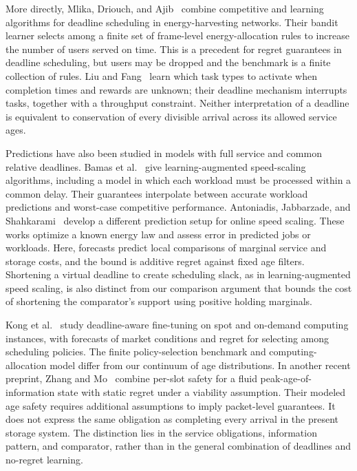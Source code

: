 \documentclass[11pt]{article}
\theoremstyle{plain}
\theoremstyle{remark}
\numberwithin{equation}{section}
\begin{document}
More directly, Mlika, Driouch, and Ajib~\cite{mlika2019deadline} combine
competitive and learning algorithms for deadline scheduling in
energy-harvesting networks. Their bandit learner selects among a finite
set of frame-level energy-allocation rules to increase the number of users
served on time. This is a precedent for regret guarantees in deadline
scheduling, but users may be dropped and the benchmark is a finite
collection of rules. Liu and Fang~\cite{liu2023scheduling} learn which task
types to activate when completion times and rewards are unknown; their
deadline mechanism interrupts tasks, together with a throughput
constraint. Neither interpretation of a deadline is equivalent to
conservation of every divisible arrival across its allowed service ages.

Predictions have also been studied in models with full service and common
relative deadlines. Bamas et al.~\cite{bamas2020learning} give
learning-augmented speed-scaling algorithms, including a model in which
each workload must be processed within a common delay. Their guarantees
interpolate between accurate workload predictions and worst-case
competitive performance. Antoniadis, Jabbarzade, and
Shahkarami~\cite{antoniadis2022prediction} develop a different prediction
setup for online speed scaling. These works optimize a known energy law
and assess error in predicted jobs or workloads. Here, forecasts predict
local comparisons of marginal service and storage costs, and the bound
is additive regret against fixed age filters. Shortening a virtual
deadline to create scheduling slack, as in learning-augmented speed
scaling, is also distinct from our comparison argument that bounds the
cost of shortening the comparator's support using positive holding
marginals.

Kong et al.~\cite{kong2025deadline} study deadline-aware fine-tuning on
spot and on-demand computing instances, with forecasts of market
conditions and regret for selecting among scheduling policies. The
finite policy-selection benchmark and computing-allocation model differ
from our continuum of age distributions. In another recent preprint,
Zhang and Mo~\cite{zhang2026hard} combine per-slot safety for a fluid
peak-age-of-information state with static regret under a viability
assumption. Their modeled age safety requires additional assumptions to
imply packet-level guarantees. It does not express the same obligation
as completing every arrival in the present storage system. The
distinction lies in the service obligations, information pattern, and
comparator, rather than in the general combination of deadlines and
no-regret learning.
\end{document}
